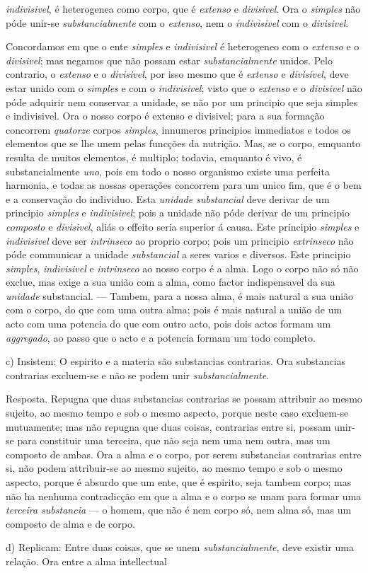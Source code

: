 \emph{indivisivel}, é heterogenea como corpo, que é \emph{extenso} e \emph{divisivel}. Ora o \emph{simples} não póde unir-se \emph{substancialmente} com o \emph{extenso}, nem o \emph{indivisivel} com o \emph{divisivel}.\par Concordamos em que o ente \emph{simples} e \emph{indivisivel} é heterogeneo com o \emph{extenso} e o \emph{divisivel}; mas negamos que não possam estar \emph{substancialmente} unidos. Pelo contrario, o \emph{extenso} e o \emph{divisivel}, por isso mesmo que é \emph{extenso} e \emph{divisivel}, deve estar unido com o \emph{simples} e com o \emph{indivisivel}; visto que o \emph{extenso} e o \emph{divisivel} não póde adquirir nem conservar a unidade, se não por um principio que seja simples e indivisivel. Ora o nosso corpo é extenso e divisivel; para a sua formação concorrem \emph{quatorze} corpos \emph{simples}, innumeros principios immediatos e todos os elementos que se lhe unem pelas funcções da nutrição. Mas, se o corpo, emquanto resulta de muitos elementos, é multiplo; todavia, emquanto é vivo, é substancialmente \emph{uno}, pois em todo o nosso organismo existe uma perfeita harmonia, e todas as nossas operações concorrem para um unico fim, que é o bem e a conservação do individuo. Esta \emph{unidade substancial} deve derivar de um principio \emph{simples} e \emph{indivisivel}; pois a unidade não póde derivar de um principio \emph{composto} e \emph{divisivel}, aliás o effeito seria superior á causa. Este principio \emph{simples} e \emph{indivisivel} deve ser \emph{intrinseco} ao proprio corpo; pois um principio \emph{extrinseco} não póde communicar a unidade \emph{substancial} a seres varios e diversos. Este principio \emph{simples}, \emph{indivisivel} e \emph{intrinseco} ao nosso corpo é a alma. Logo o corpo não só não exclue, mas exige a sua união com a alma, como factor indispensavel da sua \emph{unidade} substancial. --- Tambem, para a nossa alma, é mais natural a sua união com o corpo, do que com uma outra alma; pois é mais natural a união de um acto com uma potencia do que com outro acto, pois dois actos formam um \emph{aggregado}, ao passo que o acto e a potencia formam um todo completo.\par c) Insistem: O espirito e a materia são substancias contrarias. Ora substancias contrarias excluem-se e não se podem unir \emph{substancialmente}.\par Resposta. Repugna que duas substancias contrarias se possam attribuir ao mesmo sujeito, ao mesmo tempo e sob o mesmo aspecto, porque neste caso excluem-se mutuamente; mas não repugna que duas coisas, contrarias entre si, possam unir-se para constituir uma terceira, que não seja nem uma nem outra, mas um composto de ambas. Ora a alma e o corpo, por serem substancias contrarias entre si, não podem attribuir-se ao mesmo sujeito, ao mesmo tempo e sob o mesmo aspecto, porque é absurdo que um ente, que é espirito, seja tambem corpo; mas não ha nenhuma contradicção em que a alma e o corpo se unam para formar uma \emph{terceira substancia} --- o homem, que não é nem corpo só, nem alma só, mas um composto de alma e de corpo.\par d) Replicam: Entre duas coisas, que se unem \emph{substancialmente}, deve existir uma relação. Ora entre a alma intellectual 